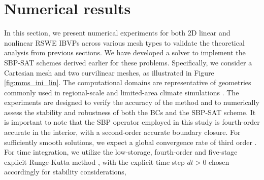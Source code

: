 \documentclass{article}
\numberwithin{equation}{section}
\theoremstyle{definition}
\begin{document}
\section{Numerical results}\label{sec:numerical-experiments}
In this section, we present numerical experiments for both 2D linear and nonlinear RSWE IBVPs across various mesh types to validate the theoretical analysis from previous sections. We have developed a solver to implement the SBP-SAT schemes derived earlier for these problems. Specifically, we consider a Cartesian mesh and two curvilinear meshes, as illustrated in Figure \ref{fig:mms_ini_lin}. The computational domains are representative of geometries commonly used in regional-scale and limited-area climate simulations \cite{DaviesTerry2014, Baumhefner01011982, Caron2013, TermoniaDeckmynHamdi2009, williamson1992standard}. 
%
The experiments are designed to verify the accuracy of the method and to numerically assess the stability and robustness of both the BCs and the SBP-SAT scheme. It is important to note that the SBP operator employed in this study is fourth-order accurate in the interior, with a second-order accurate boundary closure. For sufficiently smooth solutions, we expect a global convergence rate of third order \cite{gustafsson1975convergence, gustafsson1981convergence}. 
%
For time integration, we utilize the low-storage, fourth-order and five-stage explicit Runge-Kutta method \cite{carpenter1994fourth}, with the explicit time step $dt>0$ chosen accordingly for stability considerations,
\end{document}
